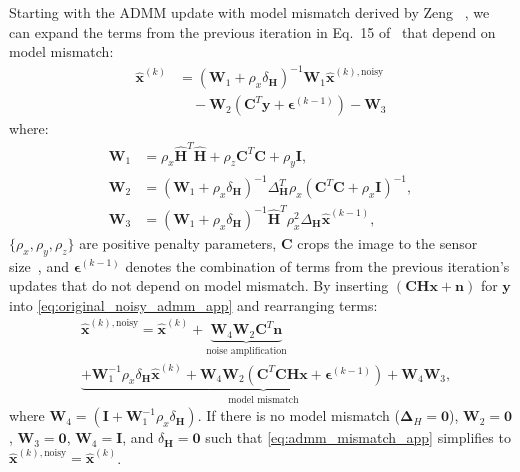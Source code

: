 \noindent Starting with the ADMM update with model mismatch derived by Zeng \etal~\cite{9546648}, we can expand the terms from the previous iteration in Eq.~15 of~\cite{9546648} that depend on model mismatch:
\begin{align}
    \bm{\hat{x}}^{(k)} &= \left( \bm{W}_1 + \rho_x \delta_{\bm{H}} \right)^{-1} \bm{W}_1 \bm{\hat{x}}^{(k),\text{noisy}}  \nonumber \\
    & \quad - \bm{W}_2 \left( \bm{C}^T \bm{y} + \bm{\epsilon}^{(k-1)} \right) - \bm{W}_3
    \label{eq:original_noisy_admm_app}
\end{align}
where:
\begin{align}
\bm{W}_1 &= \rho_x \bm{\hat{H}}^T \bm{\hat{H}} + \rho_z \bm{C}^T\bm{C} + \rho_y \bm{I}, \\
\bm{W}_2 &= (\bm{W}_1 + \rho_x \delta_{\bm{H}})^{-1} \Delta_{\bm{H}}^T \rho_x (\bm{C}^T\bm{C} + \rho_x \bm{I})^{-1}, \\
\bm{W}_3 &= \left( \bm{W}_1 + \rho_x \delta_{\bm{H}} \right)^{-1} \bm{\hat{H}}^T \rho_x^2 \Delta_{\bm{H}} \bm{\hat{x}}^{(k-1)},
\end{align}
$\{\rho_x, \rho_y, \rho_z\}$ are positive penalty parameters, $\bm{C}$ crops the image to the sensor size~\cite{Antipa:18}, and $\bm{\epsilon}^{(k-1)}$ denotes the combination of terms from the previous iteration's updates that do not depend on model mismatch.
By inserting $(\bm{C}\bm{H}\bm{x} + \bm{n})$ for $\bm{y}$ into \cref{eq:original_noisy_admm_app} and rearranging terms:
\begin{align}
&\bm{\hat{x}}^{(k),\text{noisy}} = \bm{\hat{x}}^{(k)}  + \underbrace{\bm{W}_4 \bm{W}_2\bm{C}^T \bm{n}}_{\text{noise amplification}} \nonumber \\
\label{eq:admm_mismatch_app} 
&\underbrace{+ \bm{W}_1^{-1}\rho_x \delta_{\bm{H}} \bm{\hat{x}}^{(k)} + \bm{W}_4 \bm{W}_2\left(\bm{C}^T\bm{C} \bm{H}\bm{x} + \bm{\epsilon}^{(k-1)} \right) + \bm{W}_4\bm{W}_3}_{\text{model mismatch}}, 
\end{align}
where $\bm{W}_4 = (\bm{I} + \bm{W}_1^{-1} \rho_x \delta_{\bm{H}})$.
If there is no model mismatch (\ie $\bm{\Delta}_H = \bm{0}$), $\bm{W}_2 = \bm{0}$, $\bm{W}_3 = \bm{0}$, $\bm{W}_4 = \bm{I}$, and $\delta_{\bm{H}} = \bm{0}$ such that \cref{eq:admm_mismatch_app} simplifies to $\bm{\hat{x}}^{(k),\text{noisy}} =   \bm{\hat{x}}^{(k)}$.

